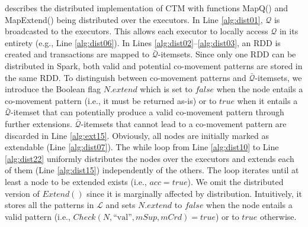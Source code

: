 \documentclass[
]{ceurart}
\renewcommand{\sf}[1]{\textsf{\textup{#1}}}
\begin{document}
 describes the distributed implementation of CTM with functions \sf{MapQ()} and \sf{MapExtend()} being distributed over the executors.
In Line \ref{alg:dist01}, $\mathcal{Q}$ is broadcasted to the executors.
This allows each executor to locally access $\mathcal{Q}$ in its entirety (e.g., Line \ref{alg:dist06}).
In Lines \ref{alg:dist02}--\ref{alg:dist03}, an RDD is created and transactions are mapped to $\bar{\mathcal{Q}}$-itemsets.
Since only one RDD can be distributed in Spark, both valid and potential co-movement patterns are stored in the same RDD.
To distinguish between co-movement patterns and $\bar{\mathcal{Q}}$-itemsets, we introduce the Boolean flag $N.extend$ which is set to $false$ when the node entails a co-movement pattern (i.e., it must be returned as-is) or to $true$ when it entails a $\bar{\mathcal{Q}}$-itemset that can potentially produce a valid co-movement pattern through further extensions. $\bar{\mathcal{Q}}$-itemsets that cannot lead to a co-movement pattern are discarded in  Line \ref{alg:ext15}.
Obviously, all nodes are initially marked as extendable (Line \ref{alg:dist07}). 
The \sf{while} loop from Line \ref{alg:dist10} to Line \ref{alg:dist22} uniformly distributes the nodes over the executors and extends each of them (Line \ref{alg:dist15}) independently of the others.
The loop iterates until at least a node to be extended exists (i.e., $acc=true$).
We omit the distributed version of $Extend()$ since it is marginally affected by distribution.
Intuitively, it stores all the patterns in $\mathcal{L}$ and sets $N.extend$ to $false$ when the node entails a valid pattern (i.e.,  $Check(N,\text{``val''},mSup,mCrd)=true$) or to $true$ otherwise.
\end{document}
